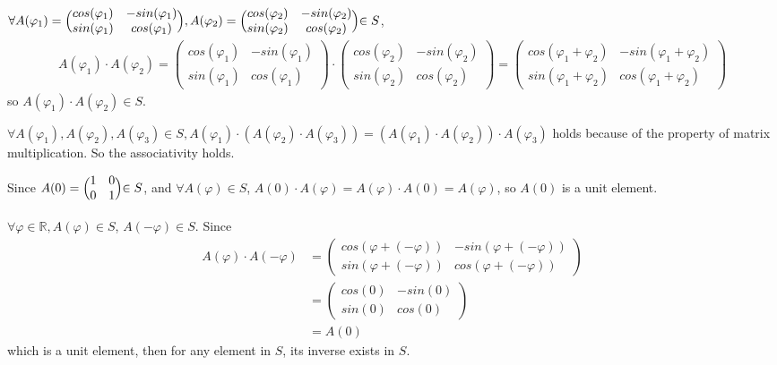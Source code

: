 \documentclass[a4paper,12pt,titlepage]{article}
\begin{document}
\subsection{}
$\forall A(\varphi_1)=\Bigl(\begin{matrix}
cos(\varphi_1)&-sin(\varphi_1)\\sin(\varphi_1)&cos(\varphi_1)\end{matrix}
\Bigl),A(\varphi_2)=\Bigl(\begin{matrix}
cos(\varphi_2)&-sin(\varphi_2)\\sin(\varphi_2)&cos(\varphi_2)\end{matrix}
\Bigl)\in S$,
\begin{align*}
A(\varphi_1)\cdot A(\varphi_2)=\begin{pmatrix}
cos(\varphi_1)&-sin(\varphi_1)\\sin(\varphi_1)&cos(\varphi_1)\end{pmatrix}\cdot \begin{pmatrix}
cos(\varphi_2)&-sin(\varphi_2)\\sin(\varphi_2)&cos(\varphi_2) \end{pmatrix}=\begin{pmatrix}
cos(\varphi_1+\varphi_2)&-sin(\varphi_1+\varphi_2)\\sin(\varphi_1+\varphi_2)&cos(\varphi_1+\varphi_2) \end{pmatrix}
\end{align*}
so $A(\varphi_1)\cdot A(\varphi_2)  \in S$.

$\forall A(\varphi_1),A(\varphi_2),A(\varphi_3)\in S, A(\varphi_1)\cdot (A(\varphi_2)\cdot A(\varphi_3))=(A(\varphi_1)\cdot A(\varphi_2))\cdot A(\varphi_3)$ holds because of the property of matrix
multiplication. So the associativity holds.

Since $A(0)=\Bigl(\begin{matrix}
1&0\\0&1\end{matrix}
\Bigl)\in S$, and $\forall A(\varphi)\in S$, $A(0)\cdot A(\varphi)=A(\varphi)\cdot A(0)=A(\varphi)$, so $A(0)$ is a unit element.

$\forall \varphi\in\mathbb{R}, A(\varphi)\in S$, $A(-\varphi)\in S$. Since \begin{align*}
A(\varphi)\cdot A(-\varphi)&= \begin{pmatrix}
cos(\varphi+(-\varphi))&-sin(\varphi+(-\varphi))\\sin(\varphi+(-\varphi))&cos(\varphi+(-\varphi)) \end{pmatrix}\\
&=\begin{pmatrix}
cos(0)&-sin(0)\\sin(0)&cos(0) \end{pmatrix}\\
&=A(0)
\end{align*} which is a unit element, then for any element in $S$, its inverse exists in $S$.
\end{document}
